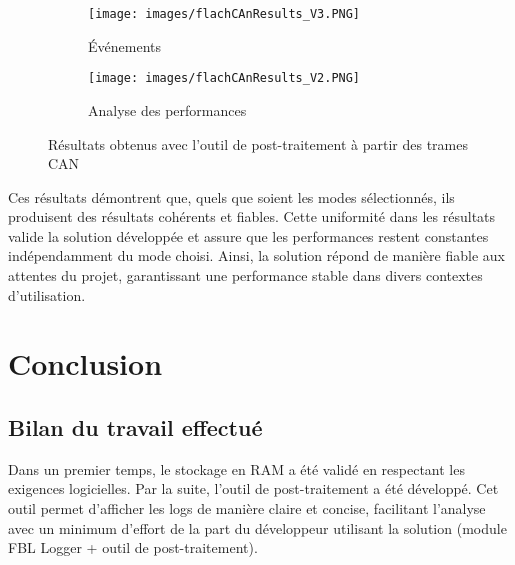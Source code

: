 \documentclass[a4paper, 12pt]{report}
\begin{document}
        \begin{figure}[H]
             \centering
             \begin{subfigure}[t]{\textwidth}
                 \centering
                \texttt{[image: images/flachCAnResults\_V3.PNG]}
            \caption{Événements}
             \end{subfigure}
             \hfill
             \vspace*{0.7cm}
             \begin{subfigure}[t]{\textwidth}
             \centering
            \texttt{[image: images/flachCAnResults\_V2.PNG]}
            \caption{Analyse des performances}
             \end{subfigure}
             \vspace*{0.3cm}
             \centering
              \caption{Résultats obtenus avec l'outil de post-traitement à partir des trames CAN}
         \end{figure}
           
            
   

   Ces résultats démontrent que, quels que soient les modes sélectionnés, ils produisent des résultats cohérents et fiables. Cette uniformité dans les résultats valide la solution développée et assure que les performances restent constantes indépendamment du mode choisi. Ainsi, la solution répond de manière fiable aux attentes du projet, garantissant une performance stable dans divers contextes d'utilisation.







\chapter{\textbf{Conclusion}}

\section{Bilan du travail effectué}

Dans un premier temps, le stockage en RAM a été validé en respectant les exigences logicielles. Par la suite, l’outil de post-traitement a été développé. Cet outil permet d’afficher les logs de manière claire et concise, facilitant l’analyse avec un minimum d’effort de la part du développeur utilisant la solution (module FBL Logger + outil de post-traitement).\\
\end{document}

